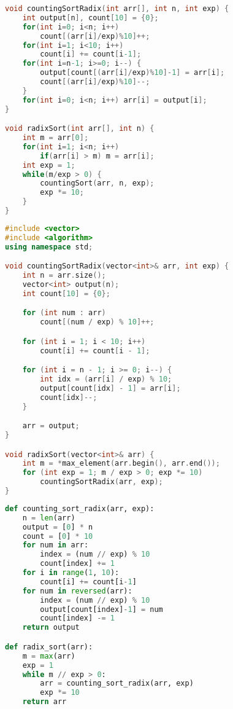 \begin{lstlisting}[language=C,caption={Radix sort em C},captionpos=t]
void countingSortRadix(int arr[], int n, int exp) {
    int output[n], count[10] = {0};
    for(int i=0; i<n; i++)
        count[(arr[i]/exp)%10]++;
    for(int i=1; i<10; i++)
        count[i] += count[i-1];
    for(int i=n-1; i>=0; i--) {
        output[count[(arr[i]/exp)%10]-1] = arr[i];
        count[(arr[i]/exp)%10]--;
    }
    for(int i=0; i<n; i++) arr[i] = output[i];
}

void radixSort(int arr[], int n) {
    int m = arr[0];
    for(int i=1; i<n; i++)
        if(arr[i] > m) m = arr[i];
    int exp = 1;
    while(m/exp > 0) {
        countingSort(arr, n, exp);
        exp *= 10;
    }
}
\end{lstlisting}

\begin{lstlisting}[language=C++,caption={Radix sort em C++},captionpos=t]
#include <vector>
#include <algorithm>
using namespace std;

void countingSortRadix(vector<int>& arr, int exp) {
    int n = arr.size();
    vector<int> output(n);
    int count[10] = {0};

    for (int num : arr)
        count[(num / exp) % 10]++;

    for (int i = 1; i < 10; i++)
        count[i] += count[i - 1];

    for (int i = n - 1; i >= 0; i--) {
        int idx = (arr[i] / exp) % 10;
        output[count[idx] - 1] = arr[i];
        count[idx]--;
    }

    arr = output;
}

void radixSort(vector<int>& arr) {
    int m = *max_element(arr.begin(), arr.end());
    for (int exp = 1; m / exp > 0; exp *= 10)
        countingSortRadix(arr, exp);
}
\end{lstlisting}

\begin{lstlisting}[language=Python,caption={Radix sort em Python},captionpos=t]
def counting_sort_radix(arr, exp):
    n = len(arr)
    output = [0] * n
    count = [0] * 10
    for num in arr:
        index = (num // exp) % 10
        count[index] += 1
    for i in range(1, 10):
        count[i] += count[i-1]
    for num in reversed(arr):
        index = (num // exp) % 10
        output[count[index]-1] = num
        count[index] -= 1
    return output

def radix_sort(arr):
    m = max(arr)
    exp = 1
    while m // exp > 0:
        arr = counting_sort_radix(arr, exp)
        exp *= 10
    return arr
\end{lstlisting}

